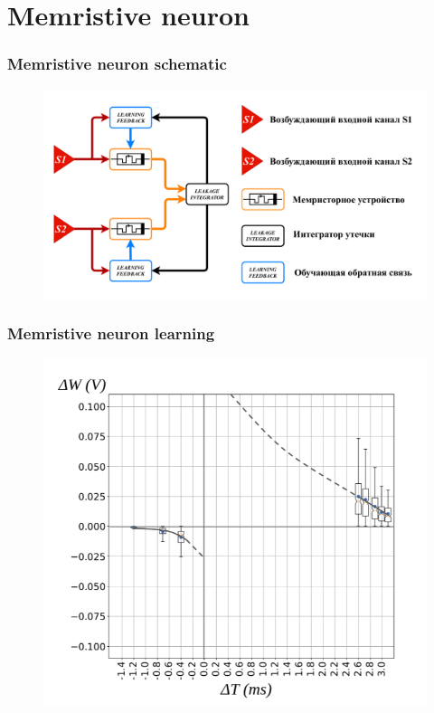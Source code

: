 \documentclass[12pt, aspectratio=169]{beamer}
\begin{document}
\section{Memristive neuron}
\begin{frame}
  \frametitle{Memristive neuron schematic}
  \begin{figure}
    \includegraphics[width=0.8\linewidth]{common_block_diag_of_mem_neuron}
  \end{figure}
\end{frame}
\begin{frame}
  \frametitle{Memristive neuron learning}
  \begin{figure}
    \includegraphics[width=0.6\linewidth]{111}
  \end{figure}
\end{frame}
\end{document}
